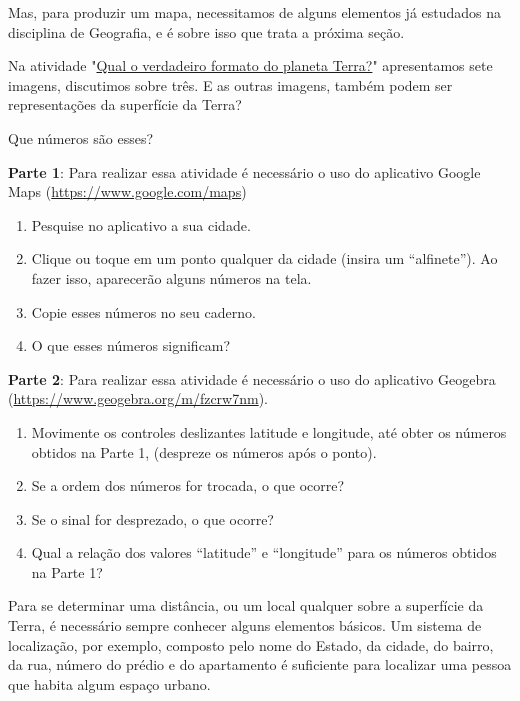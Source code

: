Mas, para produzir um mapa, necessitamos de alguns elementos já estudados na disciplina de Geografia, e é sobre isso que trata a próxima seção.



\begin{reflection}
Na atividade "\hyperref[forma_terra]{Qual o verdadeiro formato do planeta Terra?}" apresentamos sete imagens, discutimos sobre três. E as outras imagens, também podem ser representações da superfície da Terra?
\end{reflection}


\label{coord_geo}

\begin{task}{Que números são esses?}

\textbf{Parte 1}: Para realizar essa atividade é necessário o uso do aplicativo Google Maps (\url{https://www.google.com/maps})
\begin{enumerate}
\item Pesquise no aplicativo a sua cidade.
\item Clique ou toque em um ponto qualquer da cidade (insira um “alfinete”). Ao fazer isso, aparecerão alguns números na tela.
\item Copie esses números no seu caderno.
\item O que esses números significam?
\end{enumerate}

\textbf{Parte 2}: Para realizar essa atividade é necessário o uso do aplicativo Geogebra (\url{https://www.geogebra.org/m/fzcrw7nm}).
\begin{enumerate}
\item Movimente os controles deslizantes latitude e longitude, até obter os números obtidos na Parte 1, (despreze os números após o ponto).
\item Se a ordem dos números for trocada, o que ocorre?
\item Se o sinal for desprezado, o que ocorre?
\item Qual a relação dos valores “latitude” e “longitude” para os números obtidos na Parte 1?
\end{enumerate}

\end{task}


\label{organizando-coord_geo}

Para se determinar uma distância, ou um local qualquer sobre a superfície da Terra, é necessário sempre conhecer alguns elementos básicos. Um sistema de localização, por exemplo, composto pelo nome do Estado, da cidade, do bairro, da rua, número do prédio e do apartamento é suficiente para localizar uma pessoa que habita algum espaço urbano. 

